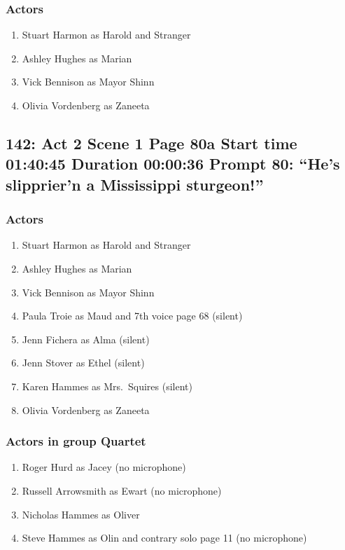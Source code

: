 \subsubsection{Actors}
\begin{enumerate}
\item Stuart Harmon as Harold and Stranger
\item Ashley Hughes as Marian
\item Vick Bennison as Mayor Shinn
\item Olivia Vordenberg as Zaneeta
\end{enumerate}


\subsection{142: Act 2 Scene 1 Page 80a Start time 01:40:45 Duration 00:00:36 Prompt 80: ``He's slipprier'n a Mississippi sturgeon!''}

\subsubsection{Actors}
\begin{enumerate}
\item Stuart Harmon as Harold and Stranger
\item Ashley Hughes as Marian
\item Vick Bennison as Mayor Shinn
\item Paula Troie as Maud and 7th voice page 68 (silent)
\item Jenn Fichera as Alma (silent)
\item Jenn Stover as Ethel (silent)
\item Karen Hammes as Mrs.~Squires (silent)
\item Olivia Vordenberg as Zaneeta
\end{enumerate}
\subsubsection{Actors in group Quartet}
\begin{enumerate}
\item Roger Hurd as Jacey (no microphone)
\item Russell Arrowsmith as Ewart (no microphone)
\item Nicholas Hammes as Oliver
\item Steve Hammes as Olin and contrary solo page 11 (no microphone)
\end{enumerate}


